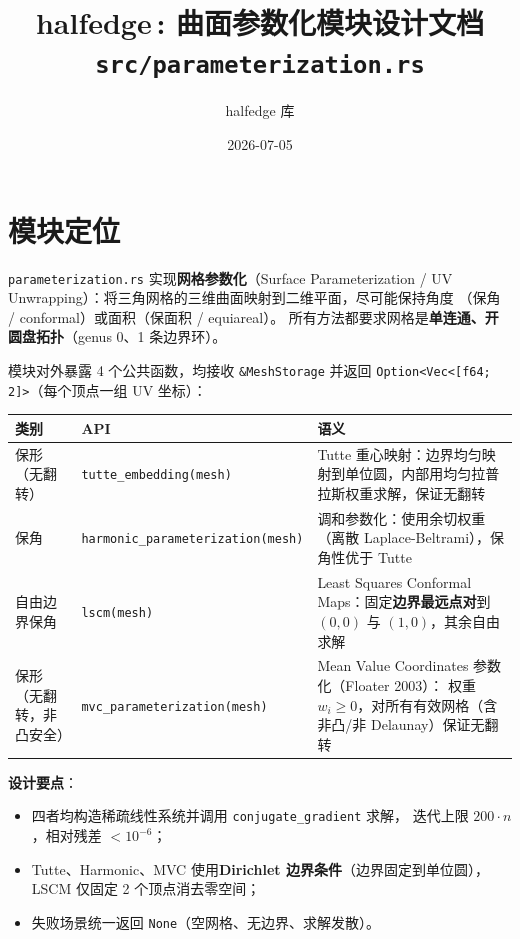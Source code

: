 \documentclass[11pt,a4paper]{article}
\title{\textbf{halfedge\,: 曲面参数化模块设计文档} \\ \large \texttt{src/parameterization.rs}}
\author{halfedge 库}
\date{2026-07-05}
\begin{document}
\maketitle
\tableofcontents

\section{模块定位}

\texttt{parameterization.rs} 实现\textbf{网格参数化}（Surface Parameterization /
UV Unwrapping）：将三角网格的三维曲面映射到二维平面，尽可能保持角度
（保角 / conformal）或面积（保面积 / equiareal）。
所有方法都要求网格是\textbf{单连通、开圆盘拓扑}（genus 0、1 条边界环）。

模块对外暴露 4 个公共函数，均接收 \texttt{\&MeshStorage} 并返回
\texttt{Option<Vec<[f64; 2]>}（每个顶点一组 UV 坐标）：

\begin{center}
\renewcommand{\arraystretch}{1.18}
\begin{tabular}{@{}p{2.4cm}p{5.2cm}p{7.1cm}@{}}
  \toprule
  \textbf{类别} & \textbf{API} & \textbf{语义} \\
  \midrule
  保形（无翻转）
    & \texttt{tutte\_embedding(mesh)}            & Tutte 重心映射：边界均匀映射到单位圆，内部用均匀拉普拉斯权重求解，保证无翻转 \\
  \midrule
  保角
    & \texttt{harmonic\_parameterization(mesh)}  & 调和参数化：使用余切权重（离散 Laplace-Beltrami），保角性优于 Tutte \\
  \midrule
  自由边界保角
    & \texttt{lscm(mesh)}                        & Least Squares Conformal Maps：固定\textbf{边界最远点对}到 $(0,0)$ 与 $(1,0)$，其余自由求解 \\
  \midrule
  保形（无翻转，非凸安全）
    & \texttt{mvc\_parameterization(mesh)}       & Mean Value Coordinates 参数化（Floater 2003）：
      权重 $w_i \ge 0$，对所有有效网格（含非凸/非 Delaunay）保证无翻转 \\
  \bottomrule
\end{tabular}
\end{center}

\textbf{设计要点}：
\begin{itemize}
  \item 四者均构造稀疏线性系统并调用 \texttt{conjugate\_gradient} 求解，
        迭代上限 $200 \cdot n$，相对残差 $< 10^{-6}$；
  \item Tutte、Harmonic、MVC 使用\textbf{Dirichlet 边界条件}（边界固定到单位圆），
        LSCM 仅固定 2 个顶点消去零空间；
  \item 失败场景统一返回 \texttt{None}（空网格、无边界、求解发散）。
\end{itemize}
\end{document}
